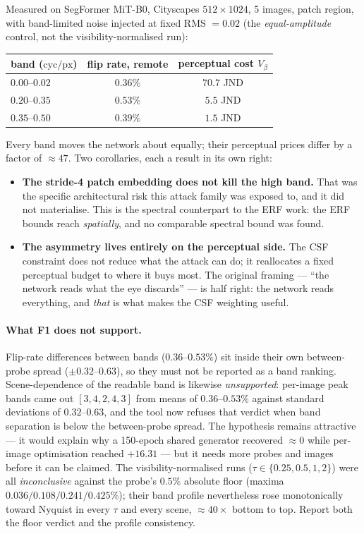 \documentclass[11pt,a4paper]{article}
\newcommand{\cpp}{\mathrm{cyc/px}}
\begin{document}
Measured on SegFormer MiT-B0, Cityscapes $512\times1024$, 5 images, patch
region, with band-limited noise injected at fixed RMS $=0.02$ (the
\emph{equal-amplitude} control, not the visibility-normalised run):
\begin{center}
\begin{tabular}{@{}lcc@{}}
\toprule
band ($\cpp$) & flip rate, remote & perceptual cost $V_\beta$ \\
\midrule
$0.00$--$0.02$ & $0.36\%$ & $70.7$ JND \\
$0.20$--$0.35$ & $0.53\%$ & $5.5$ JND \\
$0.35$--$0.50$ & $0.39\%$ & $1.5$ JND \\
\bottomrule
\end{tabular}
\end{center}
Every band moves the network about equally; their perceptual prices differ
by a factor of $\approx47$. Two corollaries, each a result in its own right:
\begin{itemize}
\item \textbf{The stride-4 patch embedding does not kill the high band.}
  That was the specific architectural risk this attack family was exposed
  to, and it did not materialise. This is the spectral counterpart to the
  ERF work: the ERF bounds reach \emph{spatially}, and no comparable
  spectral bound was found.
\item \textbf{The asymmetry lives entirely on the perceptual side.} The CSF
  constraint does not reduce what the attack can do; it reallocates a fixed
  perceptual budget to where it buys most. The original framing --- ``the
  network reads what the eye discards'' --- is half right: the network reads
  everything, and \emph{that} is what makes the CSF weighting useful.
\end{itemize}

\paragraph{What F1 does not support.}
Flip-rate differences between bands ($0.36$--$0.53\%$) sit inside their own
between-probe spread ($\pm0.32$--$0.63$), so they must not be reported as a
band ranking. Scene-dependence of the readable band is likewise
\emph{unsupported}: per-image peak bands came out $[3,4,2,4,3]$ from means
of $0.36$--$0.53\%$ against standard deviations of $0.32$--$0.63$, and the
tool now refuses that verdict when band separation is below the
between-probe spread. The hypothesis remains attractive --- it would explain
why a 150-epoch shared generator recovered $\approx0$ while per-image
optimisation reached $+16.31$ --- but it needs more probes and images before
it can be claimed. The visibility-normalised runs ($\tau\in\{0.25, 0.5, 1,
2\}$) were all \emph{inconclusive} against the probe's $0.5\%$ absolute
floor (maxima $0.036/0.108/0.241/0.425\%$); their band profile nevertheless
rose monotonically toward Nyquist in every $\tau$ and every scene,
$\approx40\times$ bottom to top. Report both the floor verdict and the
profile consistency.
\end{document}

